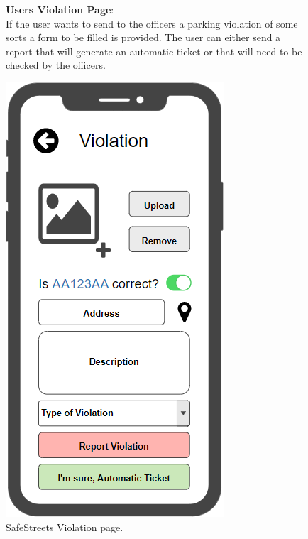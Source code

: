 \begin{figure}
	\begin{flushleft}
		\textbf{Users Violation Page}:\\
		If the user wants to send to the officers a parking violation of some sorts a form to be filled is provided. The user can either send a report that will generate an automatic ticket or that will need to be checked by the officers.
	\end{flushleft}
	\centering
	\includegraphics[width=0.6\linewidth]{../RASD/images/mockups/violation}
	\caption{SafeStreets Violation page.}
	\label{fig:violation}
\end{figure}
\clearpage
